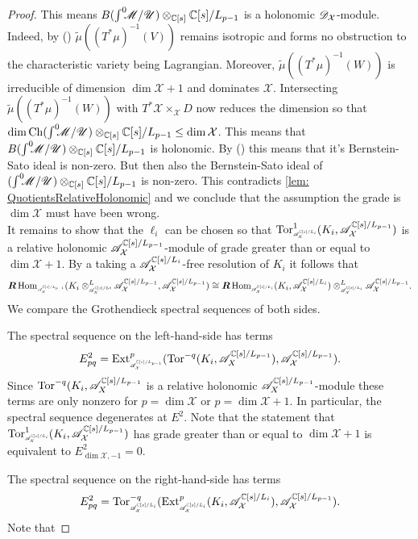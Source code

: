 \begin{proof}
  This means $B(\int^0 \mkern -8mu\mathscr{M}/ \mathscr{U})\otimes_{\mathbb{C}[s]}\mathbb{C}[s]/L_{p-1}$ is a holonomic $\mathscr{D}_\mathcal{X}$-module.
  Indeed, by () $\widetilde{\mu}((T^*\mu)^{-1}(V))$ remains isotropic and forms no obstruction to the characteristic variety being Lagrangian.
  Moreover, $\widetilde{\mu}((T^*\mu)^{-1}(W))$ is irreducible of dimension $\dim \mathcal{X}+1$ and dominates $\mathcal{X}$.
  Intersecting $\widetilde{\mu}((T^*\mu)^{-1}(W))$ with $T^*\mathcal{X}\times_\mathcal{X} D$ now reduces the dimension so that $\dim \operatorname{Ch} (\int^0 \mkern -8mu\mathscr{M}/ \mathscr{U})\otimes_{\mathbb{C}[s]}\mathbb{C}[s]/L_{p-1} \leq \dim \mathcal{X}$.
  This means that $B(\int^0 \mkern -8mu\mathscr{M}/ \mathscr{U})\otimes_{\mathbb{C}[s]}\mathbb{C}[s]/L_{p-1}$ is holonomic.
  By () this means that it's Bernstein-Sato ideal is non-zero.
  But then also the Bernstein-Sato ideal of $(\int^0 \mkern -8mu\mathscr{M}/ \mathscr{U})\otimes_{\mathbb{C}[s]}\mathbb{C}[s]/L_{p-1}$ is non-zero.
  This contradicts \cref{lem: QuotientsRelativeHolonomic} and we conclude that the assumption the grade is $\dim \mathcal{X}$ must have been wrong.\\

  It remains to show that the $\ell_i$ can be chosen so that $\Tor_{\scaleto{\A_\mathcal{X}^{\C[s]/L_i}}{7pt}}^1(K_i, \A_\mathcal{X}^{\C[s]/L_{p-1}})$ is a relative holonomic $\mathscr{A}_\mathcal{X}^{\mathbb{C}[s]/L_{p-1}}$-module of grade greater than or equal to $\dim \mathcal{X}+1$.
  By a taking a $\mathscr{A}_{\mathcal{X}}^{\mathbb{C}[s]/L_{i}}$-free resolution of $K_i$ it follows that
  $$\bR \Hom_{\scaleto{\A_\mathcal{X}^{ \C[s]/L_{p-1} }}{8pt} }(K_i\otimes^L_{\scaleto{ \A_\mathcal{X}^{\C[s]/L{i}} }{8pt} } \A_\mathcal{X}^{\C[s]/L_{p-1} },\A_\mathcal{X}^{ \C[s]/L_{p-1}} ) \cong \bR \Hom_{ \scaleto{\A_\mathcal{X}^{\C[s]/L_{i}}}{8pt} } (K_i,\A_\mathcal{X}^{\C[s]/L_{i}}) \otimes^L_{\scaleto{ \A_\mathcal{X}^{\C[s]/L_{i}}}{8pt} } \A_\mathcal{X}^{\C[s]/L_{p-1}}.$$
  We compare the Grothendieck spectral sequences of both sides.

  The spectral sequence on the left-hand-side has terms
  $$E_{pq}^2 = \Ext_{\scaleto{\A_\mathcal{X}^{\C[s]/L_{p-1}}}{8pt} }^p(\Tor^{-q}(K_i,\A_X^{\C[s]/L_{p-1}}),\A_\mathcal{X}^{\C[s]/L_{p-1}}).$$
  Since $\operatorname{Tor}^{-q}(K_i,\mathscr{A}_X^{\mathbb{C}[s]/L_{p-1}}$ is a relative holonomic $\mathscr{A}_X^{\mathbb{C}[s]/L_{p-1}}$-module these terms are only nonzero for $p=\dim \mathcal{X}$ or $p = \dim \mathcal{X}+1$.
  In particular, the spectral sequence degenerates at $E^2$.
  Note that the statement that $\Tor_{\scaleto{\A_\mathcal{X}^{\C[s]/L_i}}{7pt}}^1(K_i, \A_\mathcal{X}^{\C[s]/L_{p-1}})$ has grade greater than or equal to $\dim \mathcal{X}+1$ is equivalent to $E^2_{\dim\mathcal{X},-1} = 0$.

  The spectral sequence on the right-hand-side has terms
  $$E^2_{pq} = \Tor^{-q}_{\scaleto{ \A_\mathcal{X}^{\C[s]/L_{i}}}{8pt} }(\Ext^p_{ \scaleto{\A_\mathcal{X}^{\C[s]/L_{i}}}{8pt} } (K_i,\A_\mathcal{X}^{\C[s]/L_{i}}), \A_\mathcal{X}^{\C[s]/L_{p-1}}).$$
  Note that
\end{proof}


